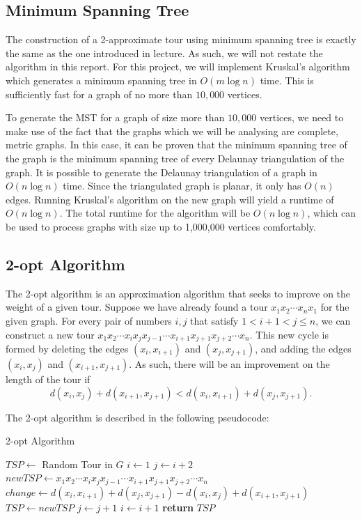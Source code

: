 \documentclass[paper=a4, fontsize=11pt]{scrartcl}	%
\numberwithin{equation}{section}		%
\numberwithin{figure}{section}			%
\numberwithin{table}{section}				%
\begin{document}
\subsection{Minimum Spanning Tree}
The construction of a 2-approximate tour using minimum spanning tree is exactly the same as the one introduced in lecture. As such, we will not restate the algorithm in this report. For this project, we will implement Kruskal's algorithm which generates a minimum spanning tree in $O(m \log n)$ time. This is sufficiently fast for a graph of no more than $10,000$ vertices.

To generate the MST for a graph of size more than $10,000$ vertices, we need to make use of the fact that the graphs which we will be analysing are complete, metric graphs. In this case, it can be proven that the minimum spanning tree of the graph is the minimum spanning tree of every Delaunay triangulation of the graph.\cite{sedgewick} It is possible to generate the Delaunay triangulation of a graph in $O(n \log n)$ time. Since the triangulated graph is planar, it only has $O(n)$ edges. Running Kruskal's algorithm on the new graph will yield a runtime of $O(n \log n)$. The total runtime for the algorithm will be $O(n \log n)$, which can be used to process graphs with size up to 1,000,000 vertices comfortably.
\subsection{2-opt Algorithm} The 2-opt algorithm is an approximation algorithm that seeks to improve on the weight of a given tour. Suppose we have already found a tour $x_1x_2\cdots x_nx_1$ for the given graph. For every pair of numbers $i, j$ that satisfy $1 < i+1 < j \le n$, we can construct a new tour $x_1x_2 \cdots x_ix_jx_{j-1} \cdots x_{i+1}x_{j+1}x_{j+2} \cdots x_n$. This new cycle is formed by deleting the edges $(x_i, x_{i+1})$ and $(x_j, x_{j+1})$, and adding the edges $(x_i, x_j)$ and $(x_{i+1}, x_{j+1})$. As such, there will be an improvement on the length of the tour if 
\[d(x_i, x_j) + d(x_{i+1}, x_{j+1})< d(x_i, x_{i+1})+d(x_j, x_{j+1}).\]

The 2-opt algorithm is described in the following pseudocode:

\begin{algorithm}
\caption{2-opt Algorithm}\label{2-opt}
\begin{algorithmic}[1]
   \State $TSP \gets $ Random Tour in $G$
	\State  $i \gets 1$
	\State  $j \gets i+2$
         \State $newTSP \gets x_1x_2 \cdots x_ix_jx_{j-1} \cdots x_{i+1}x_{j+1}x_{j+2} \cdots x_n$
         \State $change \gets  d(x_i, x_{i+1})+d(x_j, x_{j+1}) - d(x_i, x_j) + d(x_{i+1}, x_{j+1})$
         	\State $TSP \gets newTSP$
         \EndIf
         \State $j \gets j+1$
         \EndWhile
\State      $i \gets i+1$
	  \EndWhile
   \EndWhile
   \State \textbf{return} $TSP$
\EndProcedure
\end{algorithmic}
\end{algorithm}
\end{document}
